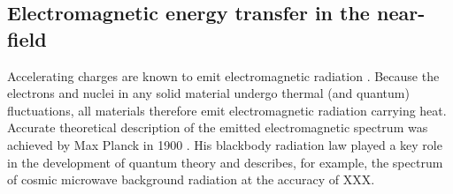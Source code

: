 






\subsection{Electromagnetic energy transfer in the near-field}
\label{sec:intro_em}
Accelerating charges are known to emit electromagnetic radiation \cite{jackson}. Because the electrons and nuclei in any solid material undergo thermal (and quantum) fluctuations, all materials therefore emit electromagnetic radiation carrying heat. Accurate theoretical description of the emitted electromagnetic spectrum was achieved by Max Planck in 1900 \cite{planck00a}. His blackbody radiation law played a key role in the development of quantum theory and describes, for example, the spectrum of cosmic microwave background radiation at the accuracy of XXX.


% 

